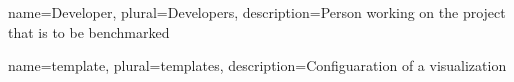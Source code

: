 \makenoidxglossaries

{
	name=Developer,
	plural=Developers,
	description={Person working on the project that is to be benchmarked}
}

{
	name=template,
	plural=templates,
	description={Configuaration of a visualization}
}


